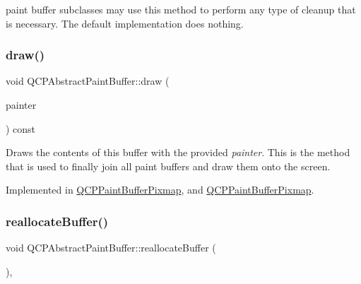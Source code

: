 paint buffer subclasses may use this method to perform any type of cleanup that is necessary. The default implementation does nothing. \mbox{\label{class_q_c_p_abstract_paint_buffer_afb998c7525e3ae37d9d2d46c7aaf461a}} 
\subsubsection{\texorpdfstring{draw()}{draw()}}
{\footnotesize\ttfamily void Q\+C\+P\+Abstract\+Paint\+Buffer\+::draw (\begin{DoxyParamCaption}\item[{\hyperlink{class_q_c_p_painter}{Q\+C\+P\+Painter} $\ast$}]{painter }\end{DoxyParamCaption}) const\hspace{0.3cm}{\ttfamily [pure virtual]}}

Draws the contents of this buffer with the provided {\itshape painter}. This is the method that is used to finally join all paint buffers and draw them onto the screen. 

Implemented in \hyperlink{class_q_c_p_paint_buffer_pixmap_af7bfc685e56a0a9329e57cd9a265eb74}{Q\+C\+P\+Paint\+Buffer\+Pixmap}, and \hyperlink{class_q_c_p_paint_buffer_pixmap_a7f8df231d2439e6b9953b86798815600}{Q\+C\+P\+Paint\+Buffer\+Pixmap}.

\mbox{\label{class_q_c_p_abstract_paint_buffer_aee7506a52bd7e5a07c2af27935eb13e7}} 
\subsubsection{\texorpdfstring{reallocate\+Buffer()}{reallocateBuffer()}}
{\footnotesize\ttfamily void Q\+C\+P\+Abstract\+Paint\+Buffer\+::reallocate\+Buffer (\begin{DoxyParamCaption}{ }\end{DoxyParamCaption})\hspace{0.3cm}{\ttfamily [protected]}, {}}

